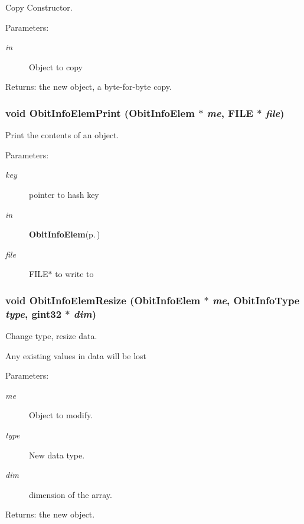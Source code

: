 Copy Constructor. 

\begin{Desc}
\item[Parameters:]
\begin{description}
\item[{\em in}]Object to copy \end{description}
\end{Desc}
\begin{Desc}
\item[Returns:]the new object, a byte-for-byte copy. \end{Desc}
\subsubsection{\setlength{\rightskip}{0pt plus 5cm}void Obit\-Info\-Elem\-Print ({\bf Obit\-Info\-Elem} $\ast$ {\em me}, FILE $\ast$ {\em file})}\label{ObitInfoElem_8h_a11}


Print the contents of an object. 

\begin{Desc}
\item[Parameters:]
\begin{description}
\item[{\em key}]pointer to hash key \item[{\em in}]{\bf Obit\-Info\-Elem}{\rm (p.\,\pageref{structObitInfoElem})} \item[{\em file}]FILE$\ast$ to write to \end{description}
\end{Desc}
\subsubsection{\setlength{\rightskip}{0pt plus 5cm}void Obit\-Info\-Elem\-Resize ({\bf Obit\-Info\-Elem} $\ast$ {\em me}, Obit\-Info\-Type {\em type}, gint32 $\ast$ {\em dim})}\label{ObitInfoElem_8h_a9}


Change type, resize data. 

Any existing values in data will be lost \begin{Desc}
\item[Parameters:]
\begin{description}
\item[{\em me}]Object to modify. \item[{\em type}]New data type. \item[{\em dim}]dimension of the array. \end{description}
\end{Desc}
\begin{Desc}
\item[Returns:]the new object. \end{Desc}
